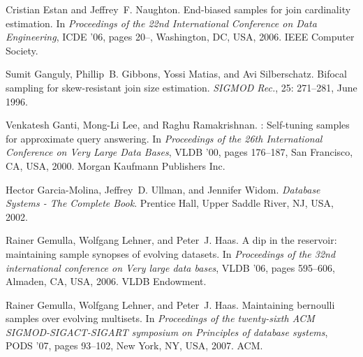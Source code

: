 \begin{thebibliography}{67}
Cristian Estan and Jeffrey~F. Naughton.
\newblock End-biased samples for join cardinality estimation.
\newblock In \emph{Proceedings of the 22nd International Conference on Data
  Engineering}, ICDE '06, pages 20--, Washington, DC, USA, 2006. IEEE Computer
  Society.

Sumit Ganguly, Phillip~B. Gibbons, Yossi Matias, and Avi Silberschatz.
\newblock Bifocal sampling for skew-resistant join size estimation.
\newblock \emph{SIGMOD Rec.}, 25: 271--281, June 1996.

Venkatesh Ganti, Mong-Li Lee, and Raghu Ramakrishnan.
: Self-tuning samples for approximate query answering.
\newblock In \emph{Proceedings of the 26th International Conference on Very
  Large Data Bases}, VLDB '00, pages 176--187, San Francisco, CA, USA, 2000.
  Morgan Kaufmann Publishers Inc.

Hector Garcia-Molina, Jeffrey~D. Ullman, and Jennifer Widom.
\newblock \emph{Database Systems - The Complete Book}.
\newblock Prentice Hall, Upper Saddle River, NJ, USA, 2002.

Rainer Gemulla, Wolfgang Lehner, and Peter~J. Haas.
\newblock A dip in the reservoir: maintaining sample synopses of evolving
  datasets.
\newblock In \emph{Proceedings of the 32nd international conference on Very
  large data bases}, VLDB '06, pages 595--606, Almaden, CA, USA, 2006. VLDB
  Endowment.

Rainer Gemulla, Wolfgang Lehner, and Peter~J. Haas.
\newblock Maintaining bernoulli samples over evolving multisets.
\newblock In \emph{Proceedings of the twenty-sixth ACM SIGMOD-SIGACT-SIGART
  symposium on Principles of database systems}, PODS '07, pages 93--102, New
  York, NY, USA, 2007. ACM.


\end{thebibliography}
